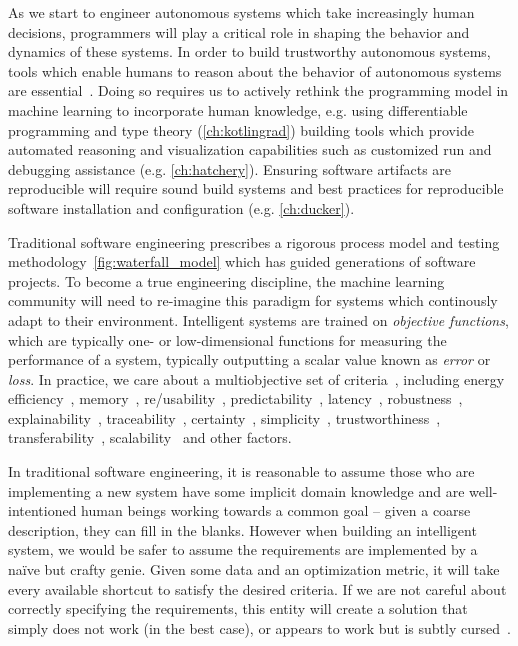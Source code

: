 As we start to engineer autonomous systems which take increasingly human decisions, programmers will play a critical role in shaping the behavior and dynamics of these systems. In order to build trustworthy autonomous systems, tools which enable humans to reason about the behavior of autonomous systems are essential~\citep{famelis2012partial}. Doing so requires us to actively rethink the programming model in machine learning to incorporate human knowledge, e.g. using differentiable programming and type theory (\autoref{ch:kotlingrad}) building tools which provide automated reasoning and visualization capabilities such as customized run and debugging assistance (e.g. \autoref{ch:hatchery}). Ensuring software artifacts are reproducible will require sound build systems and best practices for reproducible software installation and configuration (e.g. \autoref{ch:ducker}).

Traditional software engineering prescribes a rigorous process model and testing methodology~\autoref{fig:waterfall_model} which has guided generations of software projects. To become a true engineering discipline, the machine learning community will need to re-imagine this paradigm for systems which continously adapt to their environment. Intelligent systems are trained on \textit{objective functions}, which are typically one- or low-dimensional functions for measuring the performance of a system, typically outputting a scalar value known as \textit{error} or \textit{loss}. In practice, we care about a multiobjective set of criteria~\citep{censi2015mathematical}, including energy efficiency~\citep{paull2010novel}, memory~\citep{memory2013mitliagkas}, re/usability~\citep{breuleux2017automatic,deleu2019torchmeta}, predictability~\citep{turner2017well}, latency~\citep{ravanelli2018twin}, robustness~\citep{pineau2003policy}, explainability~\citep{turner2016model}, traceability~\citep{guo2017semantically, tsirigotis2018orion}, certainty~\citep{diaz2018interactive}, simplicity~\citep{kastner2019representation}, trustworthiness~\citep{xu2017efficient}, transferability~\citep{mehta2019active}, scalability~\citep{luan2019break} and other factors.

In traditional software engineering, it is reasonable to assume those who are implementing a new system have some implicit domain knowledge and are well-intentioned human beings working towards a common goal -- given a coarse description, they can fill in the blanks. However when building an intelligent system, we would be safer to assume the requirements are implemented by a na\"ive but crafty genie. Given some data and an optimization metric, it will take every available shortcut to satisfy the desired criteria. If we are not careful about correctly specifying the requirements, this entity will create a solution that simply does not work (in the best case), or appears to work but is subtly cursed~\citep{bellman1957dynamic}.


